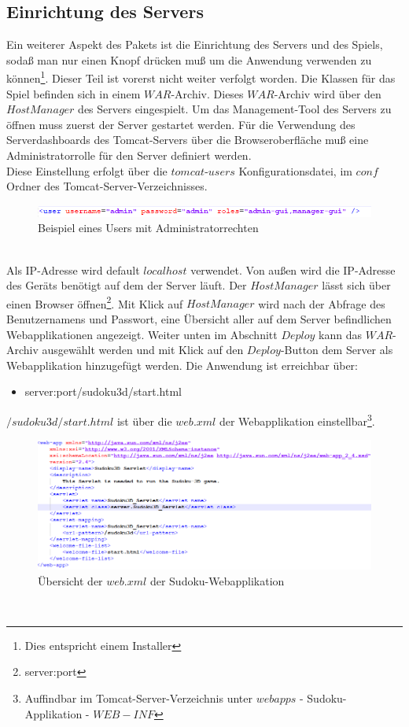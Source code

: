 \documentclass[a4paper,12pt]{scrreprt}
\begin{document}
	\subsection{Einrichtung des Servers}
	Ein weiterer Aspekt des Pakets ist die Einrichtung des Servers und des Spiels, soda{\ss} man nur
	einen Knopf dr\"ucken mu{\ss} um die Anwendung verwenden zu k\"onnen\footnote{Dies entspricht
	einem Installer}. Dieser Teil ist vorerst nicht weiter verfolgt worden. Die Klassen für das Spiel befinden
	sich in einem $WAR$-Archiv. Dieses $WAR$-Archiv wird \"uber den $Host Manager$ des Servers eingespielt.
	Um das Management-Tool des Servers zu \"offnen muss zuerst der Server gestartet werden.
	F\"ur die Verwendung des Serverdashboards des Tomcat-Servers \"uber die Browseroberfl\"ache
	mu{\ss} eine Administratorrolle f\"ur den Server definiert werden.\\
	Diese Einstellung erfolgt \"uber die $tomcat$-$users$ Konfigurationsdatei,
	im $conf$ Ordner des Tomcat-Server-Verzeichnisses.\\
	\begin{figure}[h]
		\includegraphics[scale=0.7]{pictures/adminrole_example}
		\caption{Beispiel eines Users mit Administratorrechten}
	\end{figure}\\
	Als IP-Adresse wird default $localhost$ verwendet. Von au{\ss}en wird die IP-Adresse des Ger\"ats ben\"otigt
	auf dem der Server l\"auft.
	Der $Host Manager$ l\"asst sich \"uber einen Browser \"offnen\footnote{{server}:{port}}.
	Mit Klick auf $Host Manager$ wird nach der Abfrage des Benutzernamens und Passwort, eine \"Ubersicht
	aller auf dem Server befindlichen Webapplikationen angezeigt.
	Weiter unten im Abschnitt $Deploy$ kann das $WAR$-Archiv ausgew\"ahlt werden und mit Klick auf den $Deploy$-Button
	dem Server als Webapplikation hinzugef\"ugt werden.
	Die Anwendung ist erreichbar \"uber:
	\begin{itemize}
		\item server:port/sudoku3d/start.html
	\end{itemize}
	$/sudoku3d/start.html$ ist \"uber die $web.xml$ der Webapplikation einstellbar\footnote{Auffindbar im Tomcat-Server-Verzeichnis unter $webapps$ - Sudoku-Applikation - $WEB-INF$}.\\
	\begin{figure}[h]
		\includegraphics[scale=0.7]{pictures/web_example}
		\caption{\"Ubersicht der $web.xml$ der Sudoku-Webapplikation}
	\end{figure}\\
\end{document}

